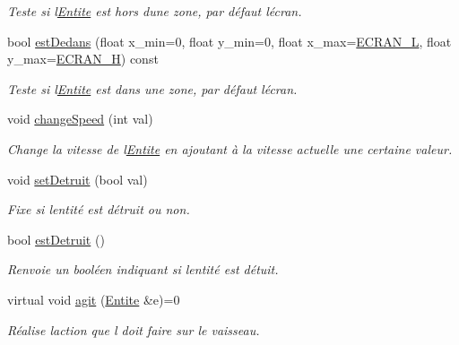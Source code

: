\begin{DoxyCompactItemize}
\begin{DoxyCompactList}\small\item\em Teste si l\textquotesingle{}\hyperlink{class_entite}{Entite} est hors d\textquotesingle{}une zone, par défaut l\textquotesingle{}écran. \end{DoxyCompactList}\item 
bool \hyperlink{class_entite_a0861182f1af724c8b5fd70b30720fa04}{est\+Dedans} (float x\+\_\+min=0, float y\+\_\+min=0, float x\+\_\+max=\hyperlink{constantes_8h_a078285dfdd5f8d9caa79aeb3f4eb0a1f}{E\+C\+R\+A\+N\+\_\+L}, float y\+\_\+max=\hyperlink{constantes_8h_a75c426da06c2ec9164baaf36a262fa07}{E\+C\+R\+A\+N\+\_\+H}) const
\begin{DoxyCompactList}\small\item\em Teste si l\textquotesingle{}\hyperlink{class_entite}{Entite} est dans une zone, par défaut l\textquotesingle{}écran. \end{DoxyCompactList}\item 
void \hyperlink{class_entite_abd20483e4d51bc7ebb0eb58bb4366757}{change\+Speed} (int val)
\begin{DoxyCompactList}\small\item\em Change la vitesse de l\textquotesingle{}\hyperlink{class_entite}{Entite} en ajoutant à la vitesse actuelle une certaine valeur. \end{DoxyCompactList}\item 
void \hyperlink{class_entite_a4b0ce40a2427f44978728dbae9560fee}{set\+Detruit} (bool val)
\begin{DoxyCompactList}\small\item\em Fixe si l\textquotesingle{}entité est détruit ou non. \end{DoxyCompactList}\item 
bool \hyperlink{class_entite_a282ac7b723e1594f49d27337a872f348}{est\+Detruit} ()
\begin{DoxyCompactList}\small\item\em Renvoie un booléen indiquant si l\textquotesingle{}entité est détuit. \end{DoxyCompactList}\item 
virtual void \hyperlink{class_entite_a848ec47afac1d7ba970a2bcab5dc7b3b}{agit} (\hyperlink{class_entite}{Entite} \&e)=0
\begin{DoxyCompactList}\small\item\em Réalise l\textquotesingle{}action que l doit faire sur le vaisseau. \end{DoxyCompactList}\item 

\end{DoxyCompactItemize}
